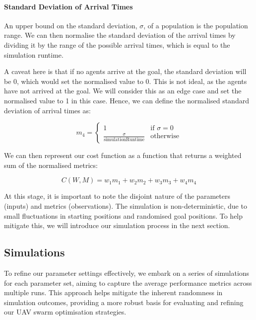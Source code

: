 \documentclass[12pt]{article}
\begin{document}
\paragraph{Standard Deviation of Arrival Times}

An upper bound on the standard deviation, $\sigma$, of a population is the population range. We can then normalise the standard deviation of the arrival times by dividing it by the range of the possible arrival times, which is equal to the simulation runtime.

A caveat here is that if no agents arrive at the goal, the standard deviation will be 0, which would set the normalised value to 0. This is not ideal, as the agents have not arrived at the goal. We will consider this as an edge case and set the normalised value to 1 in this case. Hence, we can define the normalised standard deviation of arrival times as:

\begin{equation}
    m_4 = \begin{cases}
        1 & \text{if } \sigma = 0 \\
        \frac{\sigma}{\text{simulationRuntime}} & \text{otherwise}
    \end{cases}
\end{equation}

We can then represent our cost function as a function that returns a weighted sum of the normalised metrics:

\begin{equation}
    C(W,M) = w_1m_1 + w_2m_2 + w_3m_3 + w_4m_4
\end{equation}

At this stage, it is important to note the disjoint nature of the parameters (inputs) and metrics (observations). The simulation is non-deterministic, due to small fluctuations in starting positions and randomised goal positions. To help mitigate this, we will introduce our simulation process in the next section.

\subsection{Simulations}
To refine our parameter settings effectively, we embark on a series of simulations for each parameter set, aiming to capture the average performance metrics across multiple runs. This approach helps mitigate the inherent randomness in simulation outcomes, providing a more robust basis for evaluating and refining our UAV swarm optimisation strategies.
\end{document}
